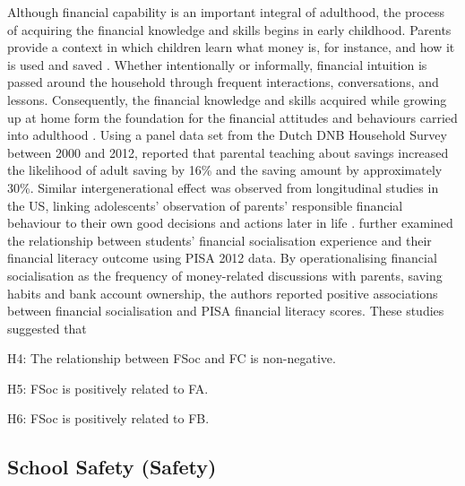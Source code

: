 \documentclass[a4paper,11pt,UKenglish,twoside,openright]{report}\usepackage[]{graphicx}\usepackage[]{color}
\begin{document}
Although financial capability is an important integral of adulthood, the process of acquiring the financial knowledge and skills begins in early childhood. Parents provide a context in which children learn what money is, for instance, and how it is used and saved \parencite{birbili:2015}. Whether intentionally or informally, financial intuition is passed around the household through frequent interactions, conversations, and lessons. Consequently, the financial knowledge and skills acquired while growing up at home form the foundation for the financial attitudes and behaviours carried into adulthood \parencite{serido:2016}. Using a panel data set from the Dutch DNB Household Survey between 2000 and 2012, \textcite{bucciol:2014} reported that parental teaching about savings increased the likelihood of adult saving by 16\% and the saving amount by approximately 30\%. Similar intergenerational effect was observed from longitudinal studies in the US, linking adolescents' observation of parents' responsible financial behaviour to their own good decisions and actions later in life \parencite{tang:2017}. \textcite{morenoherrero:2018a} further examined the relationship between students' financial socialisation experience and their financial literacy outcome using PISA 2012 data. By operationalising financial socialisation as the frequency of money-related discussions with parents, saving habits and bank account ownership, the authors reported positive associations between financial socialisation and PISA financial literacy scores. These studies suggested that
\begin{hyth}
    \item[H4:] The relationship between FSoc and FC is non-negative.
    \item[H5:] FSoc is positively related to FA.
    \item[H6:] FSoc is positively related to FB.
\end{hyth}

\subsection{School Safety (Safety)}
\end{document}

